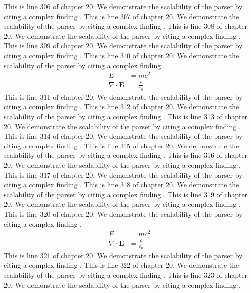 This is line 306 of chapter 20. We demonstrate the scalability of the parser by citing a complex finding \cite{ref20_306}.
This is line 307 of chapter 20. We demonstrate the scalability of the parser by citing a complex finding \cite{ref20_307}.
This is line 308 of chapter 20. We demonstrate the scalability of the parser by citing a complex finding \cite{ref20_308}.
This is line 309 of chapter 20. We demonstrate the scalability of the parser by citing a complex finding \cite{ref20_309}.
This is line 310 of chapter 20. We demonstrate the scalability of the parser by citing a complex finding \cite{ref20_310}.
\begin{align*}
  E &= mc^2 \\
  \nabla \cdot \mathbf{E} &= \frac{\rho}{\varepsilon_0}
\end{align*}
This is line 311 of chapter 20. We demonstrate the scalability of the parser by citing a complex finding \cite{ref20_311}.
This is line 312 of chapter 20. We demonstrate the scalability of the parser by citing a complex finding \cite{ref20_312}.
This is line 313 of chapter 20. We demonstrate the scalability of the parser by citing a complex finding \cite{ref20_313}.
This is line 314 of chapter 20. We demonstrate the scalability of the parser by citing a complex finding \cite{ref20_314}.
This is line 315 of chapter 20. We demonstrate the scalability of the parser by citing a complex finding \cite{ref20_315}.
This is line 316 of chapter 20. We demonstrate the scalability of the parser by citing a complex finding \cite{ref20_316}.
This is line 317 of chapter 20. We demonstrate the scalability of the parser by citing a complex finding \cite{ref20_317}.
This is line 318 of chapter 20. We demonstrate the scalability of the parser by citing a complex finding \cite{ref20_318}.
This is line 319 of chapter 20. We demonstrate the scalability of the parser by citing a complex finding \cite{ref20_319}.
This is line 320 of chapter 20. We demonstrate the scalability of the parser by citing a complex finding \cite{ref20_320}.
\begin{align*}
  E &= mc^2 \\
  \nabla \cdot \mathbf{E} &= \frac{\rho}{\varepsilon_0}
\end{align*}
This is line 321 of chapter 20. We demonstrate the scalability of the parser by citing a complex finding \cite{ref20_321}.
This is line 322 of chapter 20. We demonstrate the scalability of the parser by citing a complex finding \cite{ref20_322}.
This is line 323 of chapter 20. We demonstrate the scalability of the parser by citing a complex finding \cite{ref20_323}.
